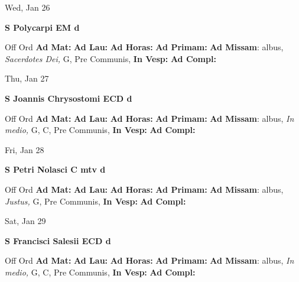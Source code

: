 \documentclass[10pt]{book}
\begin{document}
\begin{center}
\begin{minipage}{3.5in}
\vspace{2em}
\begin{center}Wed, Jan 26
\end{center}
\textbf{ \large S Polycarpi EM
\textnormal{\normalsize d}}

\begin{justify}Off Ord
\textbf{Ad Mat: }
\textbf{Ad Lau: }
\textbf{Ad Horas: }
\textbf{Ad Primam: }\textbf{Ad Missam}: albus, \textit{Sacerdotes Dei,} G, Pre Communis, 
\textbf{In Vesp: }
\textbf{Ad Compl: }
\end{justify}
\end{minipage}
\end{center}

\begin{center}
\begin{minipage}{3.5in}
\vspace{2em}
\begin{center}Thu, Jan 27
\end{center}
\textbf{ \large S Joannis Chrysostomi ECD
\textnormal{\normalsize d}}

\begin{justify}Off Ord
\textbf{Ad Mat: }
\textbf{Ad Lau: }
\textbf{Ad Horas: }
\textbf{Ad Primam: }\textbf{Ad Missam}: albus, \textit{In medio,} G, C, Pre Communis, 
\textbf{In Vesp: }
\textbf{Ad Compl: }
\end{justify}
\end{minipage}
\end{center}

\begin{center}
\begin{minipage}{3.5in}
\vspace{2em}
\begin{center}Fri, Jan 28
\end{center}
\textbf{ \large S Petri Nolasci C mtv
\textnormal{\normalsize d}}

\begin{justify}Off Ord
\textbf{Ad Mat: }
\textbf{Ad Lau: }
\textbf{Ad Horas: }
\textbf{Ad Primam: }\textbf{Ad Missam}: albus, \textit{Justus,} G, Pre Communis, 
\textbf{In Vesp: }
\textbf{Ad Compl: }
\end{justify}
\end{minipage}
\end{center}

\begin{center}
\begin{minipage}{3.5in}
\vspace{2em}
\begin{center}Sat, Jan 29
\end{center}
\textbf{ \large S Francisci Salesii ECD
\textnormal{\normalsize d}}

\begin{justify}Off Ord
\textbf{Ad Mat: }
\textbf{Ad Lau: }
\textbf{Ad Horas: }
\textbf{Ad Primam: }\textbf{Ad Missam}: albus, \textit{In medio,} G, C, Pre Communis, 
\textbf{In Vesp: }
\textbf{Ad Compl: }
\end{justify}
\end{minipage}
\end{center}
\end{document}

